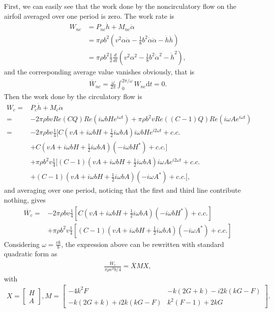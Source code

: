First, we can easily see that the work done by the noncirculatory flow on the airfoil averaged over one period is zero. The work rate is
\begin{align}
W_{nc} & =  P_{nc} \dot{h} + M_{nc} \dot{\alpha}  \\
       & =  \pi \rho b^2 (v^2 \alpha \dot{\alpha} - \frac{1}{8} b^2 \dot{\alpha} \ddot{\alpha} - \dot{h} \ddot{h})  \\
       & =  \pi \rho b^2 \frac{1}{2} \frac{d}{dt} (v^2 {\alpha}^2 - \frac{1}{8} b^2 {\dot{\alpha}}^2 - {\dot{h}}^2 ),
\end{align}
and the corresponding average value vanishes obviously, that is
\begin{align}
\overline{W}_{nc} = \frac{\omega}{2\pi} \int_{0}^{2\pi/\omega} W_{nc} \mathrm{d}t = 0.
\end{align}
Then the work done by the circulatory flow is
\begin{align}
W_{c}  = & P_{c} \dot{h} + M_{c} \dot{\alpha}  \\
        = & -2\pi \rho b v Re(CQ) Re(i\omega bH e^{i\omega t}) + \pi \rho b^2 v Re((C-1)Q) Re(i\omega A e^{i\omega t})  \\
    = & -2\pi \rho b v \frac{1}{4} [ C(vA+i\omega bH + \frac{1}{2} i\omega bA)i\omega bH e^{i2\omega t} + c.c. \\
       &  + C(vA+i\omega bH + \frac{1}{2} i\omega bA) (-i\omega bH^{*}) + c.c.]  \\
      &  +\pi \rho b^2 v \frac{1}{4} [ (C-1)(vA+i\omega bH + \frac{1}{2} i\omega bA)i\omega A e^{i2\omega t} + c.c. \\
      &   + (C-1)(vA+i\omega bH + \frac{1}{2} i\omega bA) (-i\omega A^{*}) + c.c.],
\end{align}
and averaging over one period, noticing that the first and third line contribute nothing, gives 
\begin{align}
\overline{W}_{c}  = & -2\pi \rho b v \frac{1}{4} [C(vA+i\omega bH + \frac{1}{2} i\omega bA) (-i\omega bH^{*}) + c.c.]     \\
                                  & +\pi \rho b^2 v \frac{1}{4} [(C-1)(vA+i\omega bH + \frac{1}{2} i\omega bA) (-i\omega A^{*}) + c.c.]
\end{align}
Considering  $\omega = \frac{vk}{b}$, the expression above can be rewritten with standard quadratic form as
\begin{align}
\frac{\overline{W}_{c}}{ \pi \rho v^3 b/4} = \overline{X} M X,
\end{align}
with
\begin{align}
X =  \begin{bmatrix} H  \\  A   \end{bmatrix},
M = \begin{bmatrix}   -4k^2 F   &  -k(2G+k) - i2k(kG-F)  \\
                         -k(2G+k) + i2k(kG-F)  &   k^2(F-1)+2kG  \end{bmatrix}.
\end{align}
